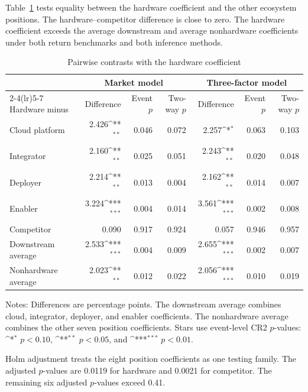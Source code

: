 \documentclass[12pt]{article}
\newcommand{\sym}[1]{\ifmmode^{#1}\else\(^{#1}\)\fi}
\begin{document}
Table~\ref{tab:a3} tests equality between the hardware coefficient and the
other ecosystem positions. The hardware--competitor difference is close to
zero. The hardware coefficient exceeds the average downstream and average
nonhardware coefficients under both return benchmarks and both inference
methods.

\begin{table}[H]
\centering
\begin{threeparttable}
\caption{Pairwise contrasts with the hardware coefficient}
\label{tab:a3}
\scriptsize
\setlength{\tabcolsep}{2.8pt}
\begin{tabular}{lrrrrrr}
\toprule
& \multicolumn{3}{c}{Market model}
& \multicolumn{3}{c}{Three-factor model} \\
\cmidrule(lr){2-4}\cmidrule(lr){5-7}
Hardware minus & Difference & Event $p$ & Two-way $p$ &
Difference & Event $p$ & Two-way $p$ \\
\midrule
Cloud platform        & 2.426\sym{**} & 0.046 & 0.072 & 2.257\sym{*} & 0.063 & 0.103 \\
Integrator            & 2.160\sym{**} & 0.025 & 0.051 & 2.243\sym{**} & 0.020 & 0.048 \\
Deployer              & 2.214\sym{**} & 0.013 & 0.004 & 2.162\sym{**} & 0.014 & 0.007 \\
Enabler               & 3.224\sym{***} & 0.004 & 0.014 & 3.561\sym{***} & 0.002 & 0.008 \\
Competitor            & 0.090 & 0.917 & 0.924 & 0.057 & 0.946 & 0.957 \\
Downstream average    & 2.533\sym{***} & 0.004 & 0.009 & 2.655\sym{***} & 0.002 & 0.007 \\
Nonhardware average   & 2.023\sym{**} & 0.012 & 0.022 & 2.056\sym{***} & 0.010 & 0.019 \\
\bottomrule
\end{tabular}
\begin{tablenotes}\footnotesize
\item Notes: Differences are percentage points. The downstream average
combines cloud, integrator, deployer, and enabler coefficients. The
nonhardware average combines the other seven position coefficients.
Stars use event-level CR2 $p$-values:
\sym{*} $p<0.10$, \sym{**} $p<0.05$, and \sym{***} $p<0.01$.
\end{tablenotes}
\end{threeparttable}
\end{table}

Holm adjustment treats the eight position coefficients as one testing
family. The adjusted $p$-values are 0.0119 for hardware and 0.0021 for
competitor. The remaining six adjusted $p$-values exceed 0.41.
\end{document}
